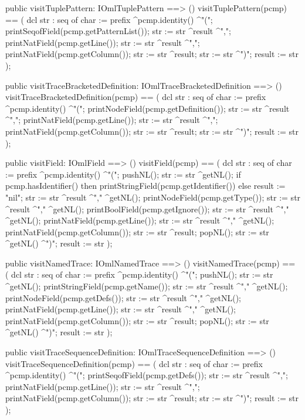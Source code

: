 \begin{vdm_al}
  public visitTuplePattern: IOmlTuplePattern ==> ()
  visitTuplePattern(pcmp) ==
    ( dcl str : seq of char := prefix ^pcmp.identity() ^"(";
      printSeqofField(pcmp.getPatternList());
      str := str ^result ^",";
      printNatField(pcmp.getLine());
      str := str ^result ^",";
      printNatField(pcmp.getColumn());
      str := str ^result;
      str := str ^")";
      result := str );

  public visitTraceBracketedDefinition: IOmlTraceBracketedDefinition ==> ()
  visitTraceBracketedDefinition(pcmp) ==
    ( dcl str : seq of char := prefix ^pcmp.identity() ^"(";
      printNodeField(pcmp.getDefinition());
      str := str ^result ^",";
      printNatField(pcmp.getLine());
      str := str ^result ^",";
      printNatField(pcmp.getColumn());
      str := str ^result;
      str := str ^")";
      result := str );

  public visitField: IOmlField ==> ()
  visitField(pcmp) ==
    ( dcl str : seq of char := prefix ^pcmp.identity() ^"(";
      pushNL();
      str := str ^getNL();
      if pcmp.hasIdentifier()
      then printStringField(pcmp.getIdentifier())
      else result := "nil";
      str := str ^result ^"," ^getNL();
      printNodeField(pcmp.getType());
      str := str ^result ^"," ^getNL();
      printBoolField(pcmp.getIgnore());
      str := str ^result ^"," ^getNL();
      printNatField(pcmp.getLine());
      str := str ^result ^"," ^getNL();
      printNatField(pcmp.getColumn());
      str := str ^result;
      popNL();
      str := str ^getNL() ^")";
      result := str );

  public visitNamedTrace: IOmlNamedTrace ==> ()
  visitNamedTrace(pcmp) ==
    ( dcl str : seq of char := prefix ^pcmp.identity() ^"(";
      pushNL();
      str := str ^getNL();
      printStringField(pcmp.getName());
      str := str ^result ^"," ^getNL();
      printNodeField(pcmp.getDefs());
      str := str ^result ^"," ^getNL();
      printNatField(pcmp.getLine());
      str := str ^result ^"," ^getNL();
      printNatField(pcmp.getColumn());
      str := str ^result;
      popNL();
      str := str ^getNL() ^")";
      result := str );

  public visitTraceSequenceDefinition: IOmlTraceSequenceDefinition ==> ()
  visitTraceSequenceDefinition(pcmp) ==
    ( dcl str : seq of char := prefix ^pcmp.identity() ^"(";
      printSeqofField(pcmp.getDefs());
      str := str ^result ^",";
      printNatField(pcmp.getLine());
      str := str ^result ^",";
      printNatField(pcmp.getColumn());
      str := str ^result;
      str := str ^")";
      result := str );


\end{vdm_al}
